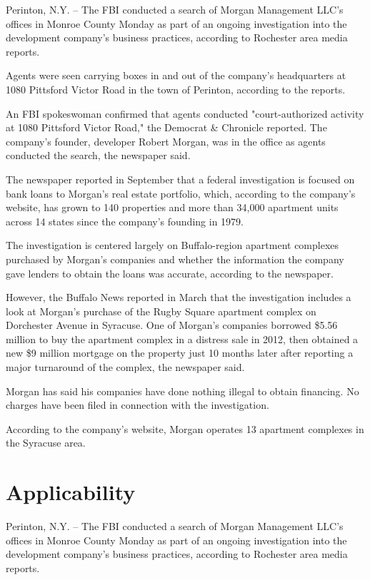 \documentclass[../../main/main.tex]{subfiles}
\begin{document}
Perinton, N.Y. -- The FBI conducted a search of Morgan Management LLC's offices in Monroe County Monday as part of an ongoing investigation into the development company's business practices, according to Rochester area media reports.

Agents were seen carrying boxes in and out of the company's headquarters at 1080 Pittsford Victor Road in the town of Perinton, according to the reports.

An FBI spokeswoman confirmed that agents conducted "court-authorized activity at 1080 Pittsford Victor Road," the Democrat \& Chronicle reported. The company's founder, developer Robert Morgan, was in the office as agents conducted the search, the newspaper said.

The newspaper reported in September that a federal investigation is focused on bank loans to Morgan's real estate portfolio, which, according to the company's website, has grown to 140 properties and more than 34,000 apartment units across 14 states since the company's founding in 1979.

The investigation is centered largely on Buffalo-region apartment complexes purchased by Morgan's companies and whether the information the company gave lenders to obtain the loans was accurate, according to the newspaper.

However, the Buffalo News reported in March that the investigation includes a look at Morgan's purchase of the Rugby Square apartment complex on Dorchester Avenue in Syracuse.  One of Morgan's companies borrowed \$5.56 million to buy the apartment complex in a distress sale in 2012, then obtained a new \$9 million mortgage on the property just 10 months later after reporting a major turnaround of the complex, the newspaper said.

Morgan has said his companies have done nothing illegal to obtain financing. No charges have been filed in connection with the investigation. 

According to the company's website, Morgan operates 13 apartment complexes in the Syracuse area.

\section{Applicability }\label{sec:applicability }

Perinton, N.Y. -- The FBI conducted a search of Morgan Management LLC's offices in Monroe County Monday as part of an ongoing investigation into the development company's business practices, according to Rochester area media reports.
\end{document}
